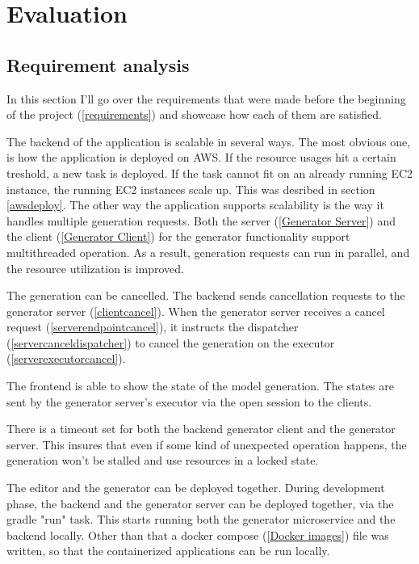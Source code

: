 \chapter{Evaluation}\label{Evaluation}

	\section{Requirement analysis}
	In this section I'll go over the requirements that were made before the beginning of the project (\ref{requirements}) 
	and showcase how each of them are satisfied.

	The backend of the application is scalable in several ways. The most obvious one, is how the application is deployed on AWS. 
	If the resource usages hit a certain treshold, a new task is deployed. If the task cannot fit on an already running EC2 instance,
	the running EC2 instances scale up. This was desribed in section \ref{awsdeploy}. The other way the application supports 
	scalability is the way it handles multiple generation requests. Both the server (\ref{Generator Server}) and the client
	(\ref{Generator Client}) for the generator 
	functionality support multithreaded operation. As a result, generation requests can run in parallel, and the resource utilization
	is improved.

	The generation can be cancelled. The backend sends cancellation requests to the generator server (\ref{clientcancel}).
	When the generator server receives a cancel request (\ref{serverendpointcancel}), it instructs the dispatcher 
	(\ref{servercanceldispatcher}) to cancel the generation on the executor (\ref{serverexecutorcancel}).

	The frontend is able to show the state of the model generation. The states are sent by the generator server's executor via
	the open session to the clients.

	There is a timeout set for both the backend generator client and the generator server. This insures that even if some kind of 
	unexpected operation happens, the generation won't be stalled and use resources in a locked state.

	The editor and the generator can be deployed together. During development phase, the backend and the generator server can be 
	deployed together, via the gradle "run" task. This starts running both the generator microservice and the backend locally.
	Other than that a docker compose (\ref{Docker images}) file was written, so that the containerized applications can be run locally.


